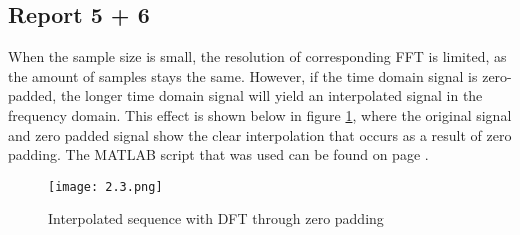 	\subsection*{Report 5 + 6}
	When the sample size is small, the resolution of corresponding FFT is limited, as the amount of samples stays the same. However, if the time domain signal is zero-padded, the longer time domain signal will yield an interpolated signal in the frequency domain. This effect is shown below in figure \ref{figure:2_3}, where the original signal and zero padded signal show the clear interpolation that occurs as a result of zero padding. The MATLAB script that was used can be found on page \pageref{matlab_2.3}.
	
	\begin{figure}[H] 
		\centering
		\texttt{[image: 2.3.png]}
		\caption{Interpolated sequence with DFT through zero padding}
		\label{figure:2_3}
	\end{figure}